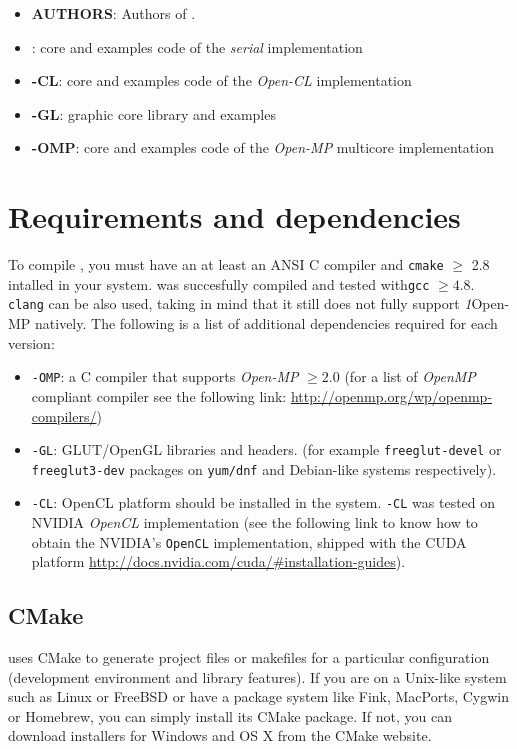 \begin{itemize}

	
    \item \textbf{AUTHORS}: Authors of \texttt{\ocal}.
	\item \textbf{\ocal}: core and examples code of the \emph{serial} implementation  
	\item \textbf{\ocal-CL}:  core and examples code of the \emph{Open-CL} implementation  
	\item \textbf{\ocal-GL}:  \texttt{\ocal} graphic core library and examples   
	\item \textbf{\ocal-OMP}:  core and examples code of the \emph{Open-MP}  multicore implementation  

\end{itemize}


\section{Requirements and dependencies}

To compile \texttt{\ocal}, you must have an at least an ANSI C compiler and \texttt{cmake} $\geq$ 2.8 intalled in your system.
\ocal was succesfully compiled and tested with\texttt{gcc} $\geq 4.8$. \texttt{clang} can be also used, taking in mind that it still does not fully support  \emph1{Open-MP} natively.
The following is a list of additional dependencies required for each \ocal version:

\begin{itemize}
	\item \texttt{\ocal-OMP}: a C compiler that supports \emph{Open-MP} $\geq 2.0$ (for a list of \emph{OpenMP} compliant compiler see the following link: \url{http://openmp.org/wp/openmp-compilers/})
	\item  \texttt{\ocal-GL}: GLUT/OpenGL libraries and headers. (for example \texttt{freeglut-devel} or \texttt{freeglut3-dev} packages on \texttt{yum/dnf} and Debian-like systems respectively).
	\item \texttt{\ocal-CL}: OpenCL platform should be installed in the system. \texttt{\ocal-CL} was tested on NVIDIA  \emph{OpenCL} implementation (see the following link to know how to obtain the NVIDIA's \texttt{OpenCL} implementation, shipped with the CUDA platform \url{http://docs.nvidia.com/cuda/#installation-guides}).
\end{itemize}



\subsection{CMake}
\ocal uses CMake to generate project files or makefiles for a particular configuration (development environment and library features). If you are on a Unix-like system such as Linux or FreeBSD or have a package system like Fink, MacPorts, Cygwin or Homebrew, you can simply install its CMake package. If not, you can download installers for Windows and OS X from the CMake website.

